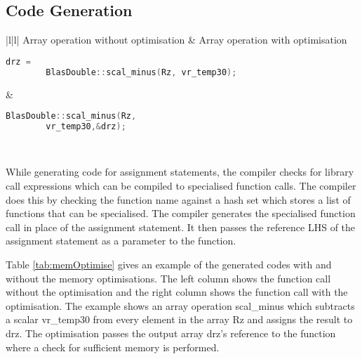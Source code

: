 \subsection{Code Generation}

\begin{table}
  \begin{tabular}{|l|l|}
  \hline
  Array operation without optimisation & 
Array operation with optimisation 
   \\
  \hhline{|=|=|}
  
  {
  \begin{lstlisting}[language=c,frame=none, numbers=none]
	drz = 
		BlasDouble::scal_minus(Rz, vr_temp30);
  \end{lstlisting}
  } &
   {
   \begin{lstlisting}[language=c,frame=none, numbers=none]
	 BlasDouble::scal_minus(Rz, 
		vr_temp30,&drz);
   \end{lstlisting}
   } \\
   \hline
   \end{tabular}
   \caption[Generated code with and without memory optimisations]{Table shows the generated code with and without memory optimisations}
   \label{tab:memOptimise}
   \end{table}
While generating code for assignment statements, the compiler checks for library call expressions which can be compiled to specialised function calls. The compiler does this by checking the function name against a hash set which stores a list of functions that can be specialised. The compiler generates the specialised function call in place of the assignment statement. It then passes the reference LHS of the assignment statement as a parameter to the function. 

Table \ref{tab:memOptimise} gives an example of the generated codes with and without the memory optimisations. The left column shows the function call without the optimisation and the right column shows the function call with the optimisation. The example shows an array operation scal\_minus which subtracts a scalar vr\_temp30 from every element in the array Rz and assigns the result to drz. The optimisation passes the output array drz's reference to the function where a check for sufficient memory is performed.
